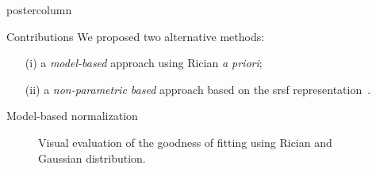 \documentclass[final, size=a0]{beamer}
\begin{document}
\begin{frame}
\begin{columns}
\begin{column}{.33\textwidth}
\begin{beamercolorbox}[center,wd=\textwidth]{postercolumn}
\begin{minipage}[T]{.95\textwidth}
{            \vspace{.5cm}

            \begin{exampleblock}{Contributions}
              \justifying
              We proposed two alternative methods:
              \begin{itemize}
              \justifying
              \item[(i)] a \emph{model-based} approach using Rician \textit{a priori};
              \item[(ii)] a \emph{non-parametric based} approach based on the \ac{srsf} representation~\cite{Srivastava2011}.
              \end{itemize}
            \end{exampleblock}

            \vspace{.5cm}

            \begin{alertblock}{Model-based normalization}
            
              \begin{figure}
                \centering
                \hfill
                \hfill
                \caption{Visual evaluation of the goodness of fitting using Rician and Gaussian distribution.}
                \label{fig:fitting}
              \end{figure}


\end{alertblock}}
\end{minipage}
\end{beamercolorbox}
\end{column}
\end{columns}
\end{frame}
\end{document}
